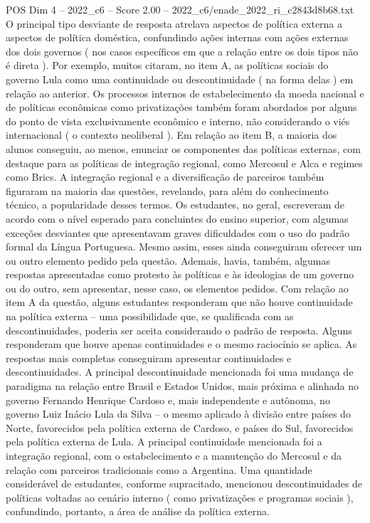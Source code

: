 \begin{textsample}{POS Dim 4 – 2022\_c6 – Score 2.00 – 2022\_c6/enade\_2022\_ri\_c2843d8b68.txt}
O principal tipo desviante de resposta atrelava aspectos de política externa a aspectos de política doméstica, confundindo ações internas com ações externas dos dois governos ( nos casos específicos em que a relação entre os dois tipos não é direta ).
Por exemplo, muitos citaram, no item A, as políticas sociais do governo Lula como uma continuidade ou descontinuidade ( na forma delas ) em relação ao anterior.
Os processos internos de estabelecimento da moeda nacional e de políticas econômicas como privatizações também foram abordados por alguns do ponto de vista exclusivamente econômico e interno, não considerando o viés internacional ( o contexto neoliberal ).
Em relação ao item B, a maioria dos alunos conseguiu, ao menos, enunciar os componentes das políticas externas, com destaque para as políticas de integração regional, como Mercosul e Alca e regimes como Brics.
A integração regional e a diversificação de parceiros também figuraram na maioria das questões, revelando, para além do conhecimento técnico, a popularidade desses termos.
Os estudantes, no geral, escreveram de acordo com o nível esperado para concluintes do ensino superior, com algumas exceções desviantes que apresentavam graves dificuldades com o uso do padrão formal da Língua Portuguesa.
Mesmo assim, esses ainda conseguiram oferecer um ou outro elemento pedido pela questão.
Ademais, havia, também, algumas respostas apresentadas como protesto às políticas e às ideologias de um governo ou do outro, sem apresentar, nesse caso, os elementos pedidos.
Com relação ao item A da questão, alguns estudantes responderam que não houve continuidade na política externa – uma possibilidade que, se qualificada com as descontinuidades, poderia ser aceita considerando o padrão de resposta.
Alguns responderam que houve apenas continuidades e o mesmo raciocínio se aplica.
As respostas mais completas conseguiram apresentar continuidades e descontinuidades.
A principal descontinuidade mencionada foi uma mudança de paradigma na relação entre Brasil e Estados Unidos, mais próxima e alinhada no governo Fernando Henrique Cardoso e, mais independente e autônoma, no governo Luiz Inácio Lula da Silva – o mesmo aplicado à divisão entre países do Norte, favorecidos pela política externa de Cardoso, e países do Sul, favorecidos pela política externa de Lula.
A principal continuidade mencionada foi a integração regional, com o estabelecimento e a manutenção do Mercosul e da relação com parceiros tradicionais como a Argentina.
Uma quantidade considerável de estudantes, conforme supracitado, mencionou descontinuidades de políticas voltadas ao cenário interno ( como privatizações e programas sociais ), confundindo, portanto, a área de análise da política externa.

\end{textsample}
